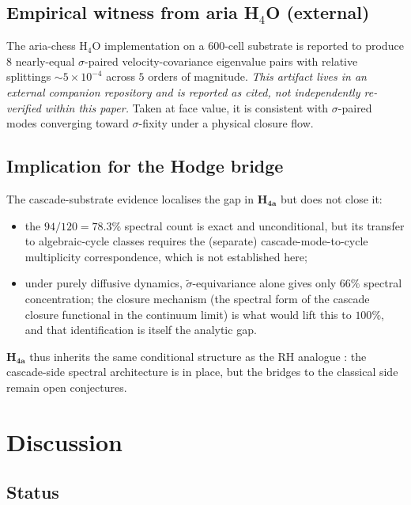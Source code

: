 \documentclass[11pt, a4paper]{amsart}
\theoremstyle{definition}
\begin{document}
\subsection{Empirical witness from aria H$_4$O (external)}

The aria-chess H$_4$O implementation \cite{ariaH4Olaw} on a
600-cell substrate is reported to produce $8$ nearly-equal
$\sigma$-paired velocity-covariance eigenvalue pairs with relative
splittings $\sim 5\times 10^{-4}$ across $5$ orders of magnitude.
\emph{This artifact lives in an external companion repository and
is reported as cited, not independently re-verified within this
paper.}  Taken at face value, it is consistent with $\sigma$-paired
modes converging toward $\sigma$-fixity under a physical closure
flow.

\subsection{Implication for the Hodge bridge}

The cascade-substrate evidence localises the gap in
$\mathbf{H_{4a}}$ but does not close it:
\begin{itemize}
\item the $94/120 = 78.3\%$ spectral count is exact and
unconditional, but its transfer to algebraic-cycle classes
requires the (separate) cascade-mode-to-cycle multiplicity
correspondence, which is not established here;
\item under purely diffusive dynamics, $\widetilde\sigma$-equivariance
alone gives only $66\%$ spectral concentration; the closure
mechanism (the spectral form of the cascade closure functional in
the continuum limit) is what would lift this to $100\%$, and that
identification is itself the analytic gap.
\end{itemize}
$\mathbf{H_{4a}}$ thus inherits the same conditional structure as
the RH analogue \cite[Remark rmk:strengthened]{CascadeRHformal}:
the cascade-side spectral architecture is in place, but the bridges
to the classical side remain open conjectures.

\section{Discussion}

\subsection{Status}
\end{document}
